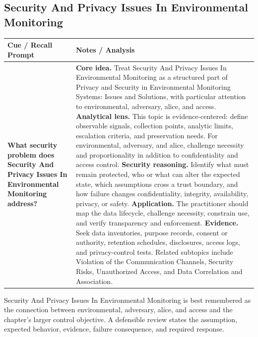 \documentclass[11pt]{article}
\newcommand{\CornellHeader}{%
\rowcolor{Navy}\color{white}\bfseries Cue / Recall Prompt & \color{white}\bfseries Notes / Analysis\\\hline}
\newcommand{\CornellRow}[2]{%
\cellcolor{CueGray}\RaggedRight\textbf{#1} & \RaggedRight #2\\\hline}
\begin{document}
\subsection*{Security And Privacy Issues In Environmental Monitoring}
\begin{longtable}{>{\RaggedRight\arraybackslash}p{}|>{\RaggedRight\arraybackslash}p{}}
\CornellHeader
\CornellRow{What security problem does Security And Privacy Issues In Environmental Monitoring address?}{\textbf{Core idea.} Treat Security And Privacy Issues In Environmental Monitoring as a structured part of Privacy and Security in Environmental Monitoring Systems: Issues and Solutions, with particular attention to environmental, adversary, alice, and access. \textbf{Analytical lens.} This topic is evidence-centered: define observable signals, collection points, analytic limits, escalation criteria, and preservation needs. For environmental, adversary, and alice, challenge necessity and proportionality in addition to confidentiality and access control. \textbf{Security reasoning.} Identify what must remain protected, who or what can alter the expected state, which assumptions cross a trust boundary, and how failure changes confidentiality, integrity, availability, privacy, or safety. \textbf{Application.} The practitioner should map the data lifecycle, challenge necessity, constrain use, and verify transparency and enforcement. \textbf{Evidence.} Seek data inventories, purpose records, consent or authority, retention schedules, disclosures, access logs, and privacy-control tests. Related subtopics include Violation of the Communication Channels, Security Risks, Unauthorized Access, and Data Correlation and Association.}
\end{longtable}
\begin{topicsummary}
Security And Privacy Issues In Environmental Monitoring is best remembered as the connection between environmental, adversary, alice, and access and the chapter's larger control objective. A defensible review states the assumption, expected behavior, evidence, failure consequence, and required response.
\end{topicsummary}
\end{document}
